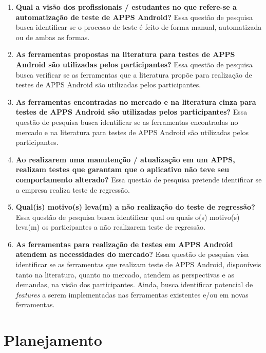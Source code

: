 \begin{enumerate}[label=\bf QP\arabic*,leftmargin=1.8cm]
    
    \item \textbf{Qual a visão dos profissionais / estudantes no que refere-se a automatização de teste de \ac{APPS} Android?} Essa questão de pesquisa busca identificar se o processo de teste é feito de forma manual, automatizada ou de ambas as formas.
    
    \item \textbf{As ferramentas propostas na literatura para testes de \ac{APPS} Android são utilizadas pelos participantes?} Essa questão de pesquisa busca verificar se as ferramentas que a literatura propõe para realização de testes de \ac{APPS} Android são utilizadas pelos participantes.
    
    \item \textbf{As ferramentas encontradas no mercado e na literatura cinza para testes de \ac{APPS} Android são utilizadas pelos participantes?} Essa questão de pesquisa busca identificar se as ferramentas encontradas no mercado e na literatura para testes de \ac{APPS} Android são utilizadas pelos participantes.
    
    \item \textbf{Ao realizarem uma manutenção / atualização em um \ac{APPS}, realizam testes que garantam que o aplicativo não teve seu comportamento alterado?} Essa questão de pesquisa pretende identificar se a empresa realiza teste de regressão.
    
    \item \textbf{Qual(is) motivo(s) leva(m) a não realização do teste de regressão?} Essa questão de pesquisa busca identificar qual ou quais o(s) motivo(s) leva(m) os participantes a não realizarem teste de regressão.
    
    \item \textbf{As ferramentas para realização de testes em \ac{APPS} Android atendem as necessidades do mercado?} Essa questão de pesquisa visa identificar se as ferramentas que realizam teste de \ac{APPS} Android, disponíveis tanto na literatura, quanto no mercado, atendem as perspectivas e as demandas, na visão dos participantes. Ainda, busca identificar potencial de \textit{features} a serem implementadas nas ferramentas existentes e/ou em novas ferramentas.
    
\end{enumerate}



\section{Planejamento}

